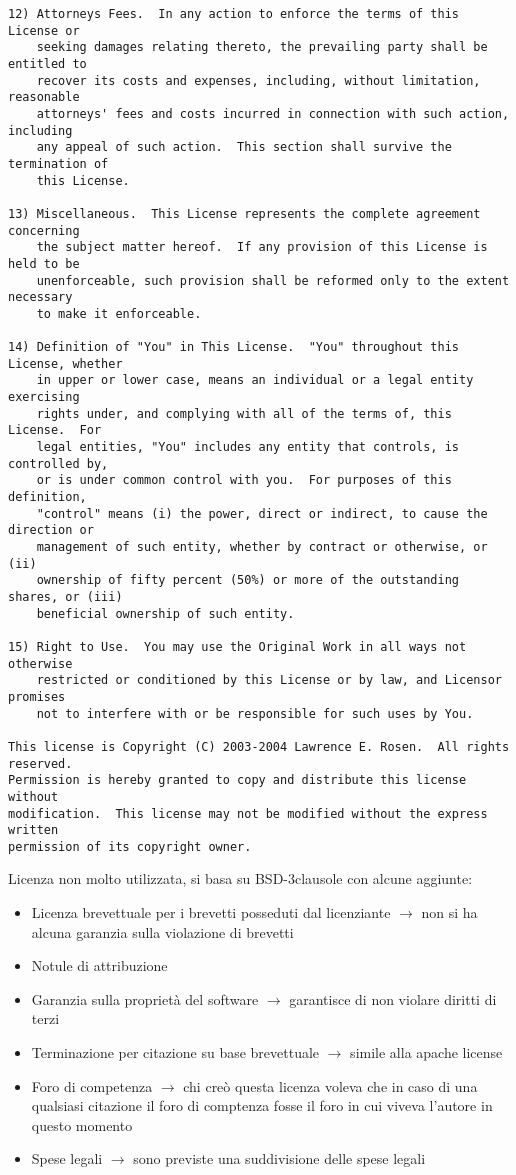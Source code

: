 \begin{verbatim}
12) Attorneys Fees.  In any action to enforce the terms of this License or
    seeking damages relating thereto, the prevailing party shall be entitled to
    recover its costs and expenses, including, without limitation, reasonable
    attorneys' fees and costs incurred in connection with such action, including 
    any appeal of such action.  This section shall survive the termination of 
    this License.

13) Miscellaneous.  This License represents the complete agreement concerning
    the subject matter hereof.  If any provision of this License is held to be
    unenforceable, such provision shall be reformed only to the extent necessary 
    to make it enforceable.

14) Definition of "You" in This License.  "You" throughout this License, whether
    in upper or lower case, means an individual or a legal entity exercising 
    rights under, and complying with all of the terms of, this License.  For 
    legal entities, "You" includes any entity that controls, is controlled by,
    or is under common control with you.  For purposes of this definition,
    "control" means (i) the power, direct or indirect, to cause the direction or
    management of such entity, whether by contract or otherwise, or (ii)
    ownership of fifty percent (50%) or more of the outstanding shares, or (iii)
    beneficial ownership of such entity.

15) Right to Use.  You may use the Original Work in all ways not otherwise
    restricted or conditioned by this License or by law, and Licensor promises
    not to interfere with or be responsible for such uses by You. 

This license is Copyright (C) 2003-2004 Lawrence E. Rosen.  All rights reserved.
Permission is hereby granted to copy and distribute this license without
modification.  This license may not be modified without the express written
permission of its copyright owner.

\end{verbatim}

Licenza non molto utilizzata, si basa su BSD-3clausole con alcune aggiunte:
\begin{itemize}
\item Licenza brevettuale per i brevetti posseduti dal licenziante $\to$ non si ha alcuna garanzia sulla violazione di brevetti
\item Notule di attribuzione
\item Garanzia sulla propriet\`a del software $\to$ garantisce di non violare diritti di terzi
\item Terminazione per citazione su base brevettuale $\to$ simile alla apache license
\item Foro di competenza $\to$ chi cre\`o questa licenza voleva che in caso di una qualsiasi citazione il foro di comptenza fosse il foro in cui viveva l'autore in questo momento
\item Spese legali $\to$ sono previste una suddivisione delle spese legali
\end{itemize}

